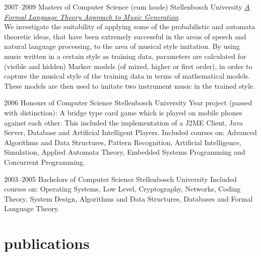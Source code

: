 \documentclass[]{friggeri-cv} %
\begin{document}
\begin{entrylist}

\entry
{2007--2009}
{Masters {\normalfont of Computer Science} (cum laude)}
{Stellenbosch University}
{\href{http://superwillow.sourceforge.net/}{\emph{A Formal Language Theory Approach to Music Generation}} \\ We investigate the suitability of applying some of the probabilistic and automata theoretic ideas, that have been extremely successful in the areas of speech and natural language processing, to the area of musical style imitation. By using music written in a certain style as training data, parameters are calculated for (visible and hidden) Markov models (of mixed, higher or first order), in order to capture the musical style of the training data in terms of mathematical models. These models are then used to imitate two instrument music in the trained style.}



\entry
{2006}
{Honours {\normalfont of Computer Science}}
{Stellenbosch University}
{Year project (passed with distinction): A bridge type card game which is played on mobile phones against each other. This included the implementation of a J2ME Client, Java Server, Database and Artificial Intelligent Players.
Included courses on: Advanced Algorithms and Data Structures, Pattern Recognition, Artificial Intelligence, Simulation, Applied Automata Theory, Embedded Systems Programming and Concurrent Programming.}

\end{entrylist}

\begin{entrylist}

\entry
{2003--2005}
{Bachelors {\normalfont of Computer Science}}
{Stellenbosch University}
{Included courses on: Operating Systems, Low Level, Cryptography, Networks, Coding Theory, System Design, Algorithms and Data Structures, Databases and Formal Language Theory.}

\end{entrylist}

\section{publications}
\end{document}
